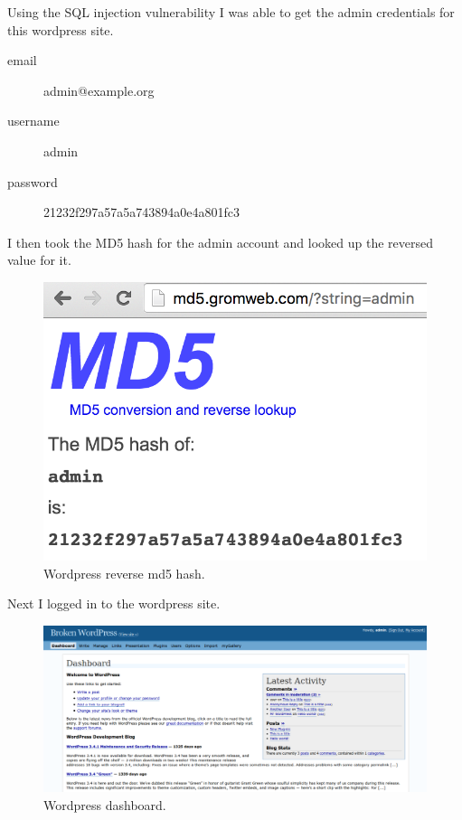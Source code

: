 \documentclass{article}
\begin{document}
Using the SQL injection vulnerability I was able to get the admin credentials for this wordpress site.\ 

\begin{description}
  \item[email] admin@example.org
  \item[username] admin
  \item[password] 21232f297a57a5a743894a0e4a801fc3
\end{description}

\newpage
I then took the MD5 hash for the admin account and looked up the reversed value for it.

\begin{figure}[h!]
	\includegraphics[width=\linewidth]{images/wp-admin-md5.png}
	\caption{Wordpress reverse md5 hash.}
	\label{fig:wordpress3}
\end{figure}

\newpage
Next I logged in to the wordpress site.

\begin{figure}[h!]
	\includegraphics[width=\linewidth]{images/wp-logged-in.png}
	\caption{Wordpress dashboard.}
	\label{fig:wordpress4}
\end{figure}
\end{document}
